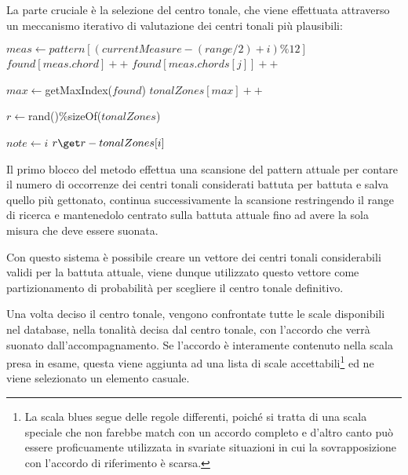 La parte cruciale è la selezione del centro tonale, che viene effettuata attraverso un meccanismo iterativo di valutazione dei centri tonali più plausibili:

\begin{algorithm}
\caption{}
\label{algo-director-tzone}
\begin{algorithmic}[1]
			\State $meas \gets pattern[(currentMeasure - (range/2) + i) \% 12]$
				\State $found[meas.chord] ++$
			\Else
				 	\State $found[meas.chords[j]] ++$
				\EndFor
			\EndIf
		\EndFor
		
		\State $max \gets $getMaxIndex($found$)
		\State $tonalZones[max] ++$
		
	\EndFor
	
	\State $r \gets $rand()$ \% $sizeOf($tonalZones$)
	
				\State $note \gets i$
				\Break
			\Else
				\State $r \get r - tonalZones[i]$
			\EndIf
		\EndIf
	\EndFor
\EndFunction
\end{algorithmic}
\end{algorithm}

Il primo blocco del metodo effettua una scansione del pattern attuale per contare il numero di occorrenze dei centri tonali considerati battuta per battuta e salva quello più gettonato, continua successivamente la scansione restringendo il range di ricerca e mantenedolo centrato sulla battuta attuale fino ad avere la sola misura che deve essere suonata.

Con questo sistema è possibile creare un vettore dei centri tonali considerabili validi per la battuta attuale, viene dunque utilizzato questo vettore come partizionamento di probabilità per scegliere il centro tonale definitivo.

Una volta deciso il centro tonale, vengono confrontate tutte le scale disponibili nel database, nella tonalità decisa dal centro tonale, con l'accordo che verrà suonato dall'accompagnamento. Se l'accordo è interamente contenuto nella scala presa in esame, questa viene aggiunta ad una lista di scale accettabili\footnote{La scala blues segue delle regole differenti, poiché si tratta di una scala speciale che non farebbe match con un accordo completo e d'altro canto può essere proficuamente utilizzata in svariate situazioni in cui la sovrapposizione con l'accordo di riferimento è scarsa.} ed ne viene selezionato un elemento casuale.

